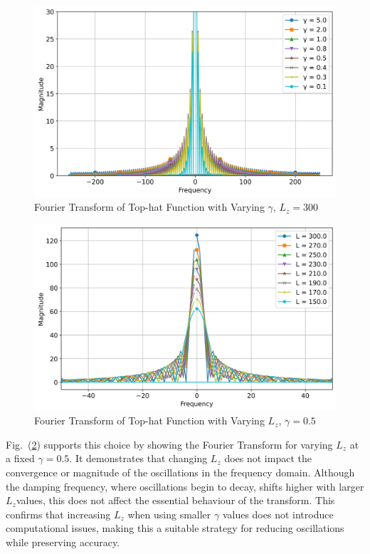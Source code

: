 \begin{figure}[htbp]
  \centering
  \includegraphics[width=\linewidth]{images/fourieroftophatvarygammaL300.jpg}
  \caption{Fourier Transform of Top-hat Function with Varying $\gamma$, $L_z = 300$}
  \label{fig:fourieroftophatvarygammaL300}
\end{figure}
  

\begin{figure}[htbp]
  \centering
  \includegraphics[width=\linewidth]{images/fourieroftophatvaryL_gamma0.5.jpg}
  \caption{Fourier Transform of Top-hat Function with Varying $L_z$, $\gamma = 0.5$}
  \label{fig:fourieroftophatvaryL_gamma0}
\end{figure}

Fig.~(\ref{fig:fourieroftophatvaryL_gamma0}) supports this choice by showing the Fourier Transform for varying $L_z$ at a fixed $\gamma = 0.5$. It demonstrates that changing $L_z$ does not impact the convergence or magnitude of the oscillations in the frequency domain. Although the damping frequency, where oscillations begin to decay, shifts higher with larger $L_z$values, this does not affect the essential behaviour of the transform. This confirms that increasing $L_z$ when using smaller $\gamma$ values does not introduce computational issues, making this a suitable strategy for reducing oscillations while preserving accuracy.

